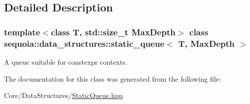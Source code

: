 \subsection{Detailed Description}
\subsubsection*{template$<$class T, std\+::size\+\_\+t Max\+Depth$>$\newline
class sequoia\+::data\+\_\+structures\+::static\+\_\+queue$<$ T, Max\+Depth $>$}

A queue suitable for constexpr contexts. 

The documentation for this class was generated from the following file\+:\begin{DoxyCompactItemize}
\item 
Core/\+Data\+Structures/\mbox{\hyperlink{_static_queue_8hpp}{Static\+Queue.\+hpp}}\end{DoxyCompactItemize}
